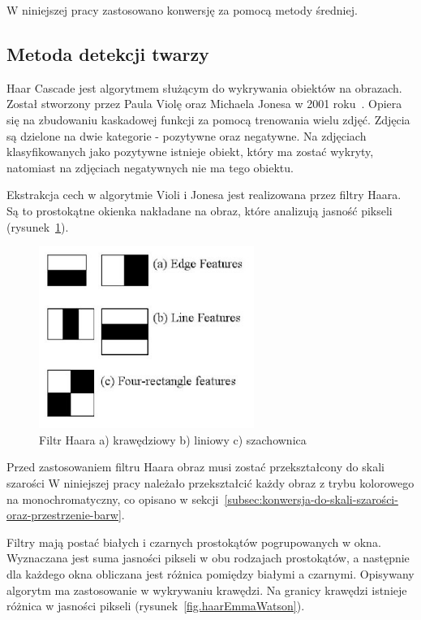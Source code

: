 \documentclass[a4paper,twoside,12pt]{book}
\begin{document}
    W niniejszej pracy zastosowano konwersję za pomocą metody średniej.
    \subsection{Metoda detekcji twarzy}\label{subsec:algorytm-haar-cascade}

    Haar Cascade jest algorytmem służącym do wykrywania obiektów na obrazach.
    Został stworzony przez Paula Violę oraz Michaela Jonesa w 2001 roku~\cite{violaJones}.
    Opiera się na zbudowaniu kaskadowej funkcji za pomocą trenowania wielu zdjęć.
    Zdjęcia są dzielone na
    dwie kategorie - pozytywne oraz negatywne.
    Na zdjęciach klasyfikowanych jako pozytywne istnieje obiekt, który ma zostać wykryty, natomiast
    na zdjęciach negatywnych nie ma tego obiektu.

    Ekstrakcja cech w algorytmie Violi i Jonesa jest realizowana przez filtry Haara.
    Są to prostokątne okienka
    nakładane na obraz, które analizują jasność pikseli (rysunek~\ref{fig.haarRectangles}).
    \begin{figure}
        \centering
        \includegraphics[width=7cm]{Obrazy/Haar_filter_rectangles.jpg}
        \caption{Filtr Haara a) krawędziowy b) liniowy c) szachownica~\cite{haar}}
        \label{fig.haarRectangles}
    \end{figure}

    Przed zastosowaniem filtru Haara obraz musi zostać przekształcony do skali szarości
    W niniejszej pracy należało przekształcić każdy obraz z trybu kolorowego na monochromatyczny, co opisano w sekcji~\ref{subsec:konwersja-do-skali-szarości-oraz-przestrzenie-barw}.

    Filtry mają postać białych i czarnych prostokątów pogrupowanych w okna. %
    Wyznaczana jest suma jasności pikseli w obu rodzajach prostokątów, a
    następnie dla każdego okna obliczana jest różnica pomiędzy białymi a czarnymi.
    Opisywany algorytm ma zastosowanie w wykrywaniu krawędzi.
    Na granicy krawędzi istnieje różnica w jasności pikseli
    (rysunek~\ref{fig.haarEmmaWatson}).
\end{document}
